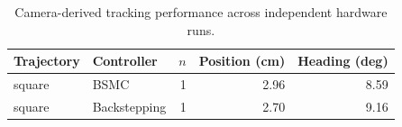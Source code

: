 \begin{table}[!t]
\centering
\caption{Camera-derived tracking performance across independent hardware runs.}
\label{tab:tracking}
\begin{tabular}{llrrr}
\hline
Trajectory & Controller & $n$ & Position (cm) & Heading (deg) \\
\hline
square & BSMC & 1 & 2.96 & 8.59 \\
square & Backstepping & 1 & 2.70 & 9.16 \\
\hline
\end{tabular}
\end{table}

